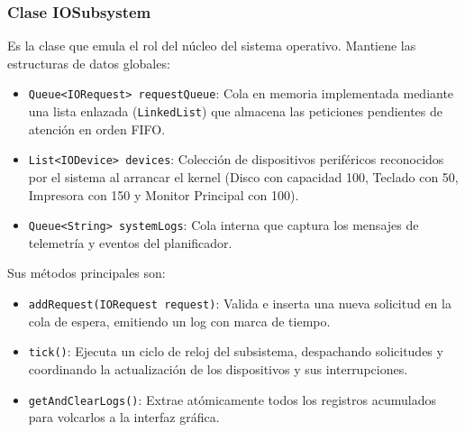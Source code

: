 \documentclass[11pt,letterpaper]{article}
\begin{document}
\subsubsection{Clase IOSubsystem}
Es la clase que emula el rol del núcleo del sistema operativo. Mantiene las estructuras de datos globales:
\begin{itemize}
    \item \texttt{Queue<IORequest> requestQueue}: Cola en memoria implementada mediante una lista enlazada (\texttt{LinkedList}) que almacena las peticiones pendientes de atención en orden FIFO.
    \item \texttt{List<IODevice> devices}: Colección de dispositivos periféricos reconocidos por el sistema al arrancar el kernel (Disco con capacidad 100, Teclado con 50, Impresora con 150 y Monitor Principal con 100).
    \item \texttt{Queue<String> systemLogs}: Cola interna que captura los mensajes de telemetría y eventos del planificador.
\end{itemize}
Sus métodos principales son:
\begin{itemize}
    \item \texttt{addRequest(IORequest request)}: Valida e inserta una nueva solicitud en la cola de espera, emitiendo un log con marca de tiempo.
    \item \texttt{tick()}: Ejecuta un ciclo de reloj del subsistema, despachando solicitudes y coordinando la actualización de los dispositivos y sus interrupciones.
    \item \texttt{getAndClearLogs()}: Extrae atómicamente todos los registros acumulados para volcarlos a la interfaz gráfica.
\end{itemize}
\end{document}
